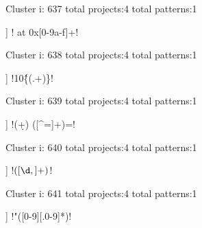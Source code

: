 Cluster i: 637
total projects:4
total patterns:1
\begin{multicols}{1}
\begin{description}[noitemsep,topsep=0pt]
\item [[4] ] \cverb! at 0x[0-9a-f]+!
\end{description}
\end{multicols}







Cluster i: 638
total projects:4
total patterns:1
\begin{multicols}{1}
\begin{description}[noitemsep,topsep=0pt]
\item [[4] ] \cverb!10\^\{(.+)\}!
\end{description}
\end{multicols}







Cluster i: 639
total projects:4
total patterns:1
\begin{multicols}{1}
\begin{description}[noitemsep,topsep=0pt]
\item [[4] ] \cverb!(\d+) ([^=]+)=!
\end{description}
\end{multicols}







Cluster i: 640
total projects:4
total patterns:1
\begin{multicols}{1}
\begin{description}[noitemsep,topsep=0pt]
\item [[4] ] \cverb!\(([\d,]+)\)!
\end{description}
\end{multicols}







Cluster i: 641
total projects:4
total patterns:1
\begin{multicols}{1}
\begin{description}[noitemsep,topsep=0pt]
\item [[4] ] \cverb!"([0-9][.0-9]*)!
\end{description}
\end{multicols}







